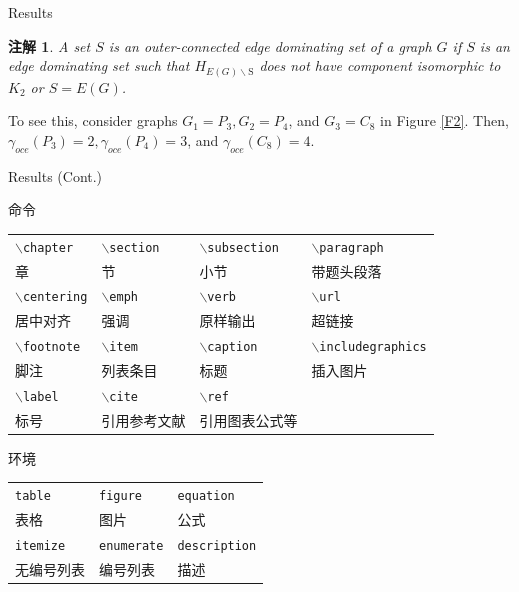 \documentclass[11pt, fontset=windows, ignorenonframetext]{beamer}  %
\def\cmd#1{\texttt{\color{red}\footnotesize $\backslash$#1}} %
\def\env#1{\texttt{\color{blue}\footnotesize #1}} %
\newtheorem{Cremark}[theorem]{注解}
\numberwithin{subsection}{section}
\numberwithin{theorem}{subsection}
\renewcommand{\indent}{\hspace*{2em}} %
\begin{document}
	\begin{frame}{Results}
		\begin{Cremark}\label{rem2}
			A set $S$ is an outer-connected edge dominating set of a graph $G$ if $S$ is an edge dominating set such that $H_{E(G) \backslash \mathrm{S}}$ does not have component isomorphic to $K_{2}$ or $S=E(G)$.
		\end{Cremark}
		\pause
		\indent To see this, consider graphs $G_{1}=P_{3}, G_{2}=P_{4}$, and $G_{3}=C_{8}$ in Figure \ref{F2}.
		Then, $\gamma_{oce}(P_{3})=2, \gamma_{oce}(P_{4})=3$, and $\gamma_{o c e}(C_{8})=4$.
	\end{frame}

	\begin{frame}{Results (Cont.)}
		\begin{exampleblock}{命令}
			\centering
			\footnotesize
			\begin{tabular}{llll}
				\cmd{chapter} & \cmd{section} & \cmd{subsection} & \cmd{paragraph} \\
				章 & 节 & 小节 & 带题头段落 \\\hline
				\cmd{centering} & \cmd{emph} & \cmd{verb} & \cmd{url} \\
				居中对齐 & 强调 & 原样输出 & 超链接 \\\hline
				\cmd{footnote} & \cmd{item} & \cmd{caption} & \cmd{includegraphics} \\
				脚注 & 列表条目 & 标题 & 插入图片 \\\hline
				\cmd{label} & \cmd{cite} & \cmd{ref} \\
				标号 & 引用参考文献 & 引用图表公式等\\\hline
			\end{tabular}
		\end{exampleblock}

		\begin{exampleblock}{环境}
			\centering
			\footnotesize
			\begin{tabular}{lll}
				\env{table} & \env{figure} & \env{equation}\\
				表格 & 图片 & 公式 \\\hline
				\env{itemize} & \env{enumerate} & \env{description}\\
				无编号列表 & 编号列表 & 描述 \\\hline
			\end{tabular}
		\end{exampleblock}
	\end{frame}
\end{document}
